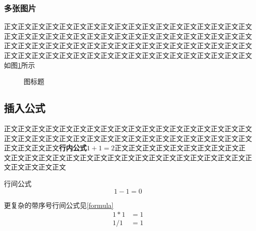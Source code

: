 \documentclass[a4paper]{article}
\begin{document}
\subsubsection{多张图片}
正文正文正文正文正文正文正文正文正文正文正文正文正文正文正文正文正文正文正文正文正文正文正文正文正文正文正文正文正文正文正文正文正文正文正文正文正文正文正文正文正文正文正文正文正文正文正文正文正文正文正文正文正文正文正文正文正文正文正文正文正文正文正文正文正文正文正文正文正文正文正文正文如图\ref{fig2}所示

\begin{figure}[!h]
	\centering
	\caption{图标题}
	\label{fig2}
\end{figure}

\subsection{插入公式}
正文正文正文正文正文正文正文正文正文正文正文正文正文正文正文正文正文正文正文正文正文正文正文正文正文正文正文正文正文正文正文正文正文正文正文正文正文正文正文正文\textbf{行内公式}$1+1=2$正文正文正文正文正文正文正文正文正文正文正文正文正文正文正文正文正文正文正文正文正文正文正文正文正文正文正文正文正文正文正文正文

行间公式
$$
1-1=0
$$

更复杂的带序号行间公式见\ref{formula}
\begin{equation}
\begin{aligned}
1*1&=1\\
1/1&=1
\end{aligned}
\label{formula}
\end{equation}
\end{document}
